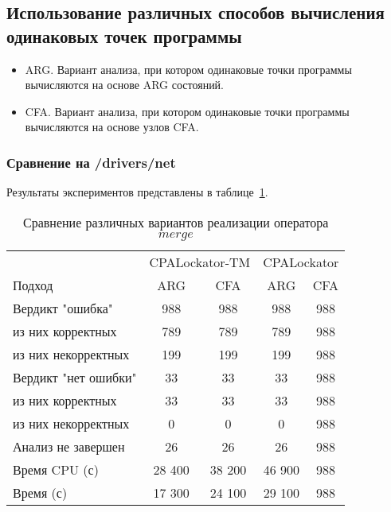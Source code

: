 \subsection{Использование различных способов вычисления одинаковых точек программы}

\begin{itemize}
\item ARG. Вариант анализа, при котором одинаковые точки программы вычисляются на основе ARG состояний.
\item CFA. Вариант анализа, при котором одинаковые точки программы вычисляются на основе узлов CFA.
\end{itemize}

\subsubsection{Сравнение на /drivers/net}
Результаты экспериментов представлены в таблице~\ref{table-drivers-lock-merge}.

\begin{center}
  \begin{table}[h]\footnotesize
  	\label{table-drivers-lock-merge}
    \caption{Сравнение различных вариантов реализации оператора $merge$}
    \begin{tabular}{ | l | c | c | c | c | }
      \hline
      		& 		\multicolumn{2}{|c|}{CPALockator-TM} & \multicolumn{2}{|c|}{CPALockator} \\
      Подход         				& ARG 	& CFA 		& ARG   	& CFA    \\ \hline
      Вердикт "ошибка" 				& 988   & 988       & 988   	& 988        \\ 
  \hspace{0.5cm} из них корректных 	& 789 	& 789 		& 789     	& 988       \\ 
  \hspace{0.5cm} из них некорректных & 199 	& 199 		& 199     	& 988       \\ \hline
      Вердикт "нет ошибки"  		& 33    & 33        & 33     	& 988      \\ 
  \hspace{0.5cm} из них корректных 	& 33 	& 33    	& 33       	& 988     \\
  \hspace{0.5cm} из них некорректных & 0 	& 0    		& 0      	& 988    \\ \hline
      Анализ не завершен       		& 26    & 26        & 26     	& 988      \\ \hline
      Время CPU (с)   				& 28 400 & 38 200   & 46 900   	& 988    \\ 
      Время (с)  					& 17 300 & 24 100   & 29 100    & 988     \\
      \hline
    \end{tabular}
  \end{table}
\end{center}

